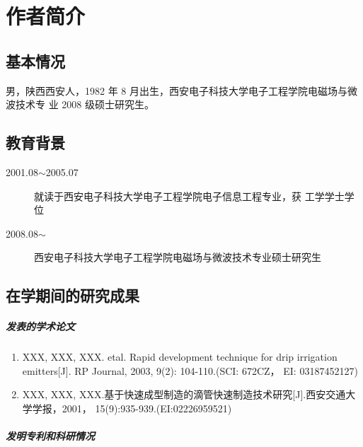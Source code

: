 
\chapter*{作者简介}

\section*{\textbf{基本情况}}

男，陕西西安人，1982 年 8 月出生，西安电子科技大学电子工程学院电磁场与微波技术专
业 2008 级硕士研究生。
\section*{\textbf{教育背景}}

\begin{description}
  \item[2001.08$\sim$2005.07] 就读于西安电子科技大学电子工程学院电子信息工程专业，获
    工学学士学位
  \item[2008.08$\sim$] 西安电子科技大学电子工程学院电磁场与微波技术专业硕士研究生
\end{description}

\section*{\textbf{在学期间的研究成果}}

\paragraph{发表的学术论文}

\begin{enumerate}
\item XXX, XXX, XXX. etal. Rapid development technique for drip irrigation
  emitters[J]. RP Journal, 2003, 9(2): 104-110.(SCI: 672CZ， EI: 03187452127)
\item XXX, XXX, XXX.基于快速成型制造的滴管快速制造技术研究[J].西安交通大学学报，2001，
15(9):935-939.(EI:02226959521)
\end{enumerate}

\paragraph{发明专利和科研情况}

